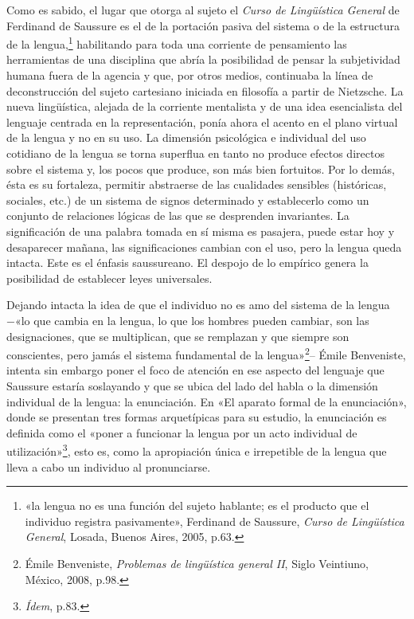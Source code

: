Como es sabido, el lugar que otorga al sujeto el \emph{Curso de Lingüística General} de Ferdinand de Saussure es el de la portación pasiva del sistema o de la estructura de la lengua,\footnote{«la lengua no es una función del sujeto hablante; es el producto que el individuo registra pasivamente», Ferdinand de Saussure, \emph{Curso de Lingüística General}, Losada, Buenos Aires, 2005, p.63.} habilitando para toda una corriente de pensamiento las herramientas de una disciplina que abría la posibilidad de pensar la subjetividad humana fuera de la agencia y que, por otros medios, continuaba la línea de deconstrucción del sujeto cartesiano iniciada en filosofía a partir de Nietzsche. La nueva lingüística, alejada de la corriente mentalista y de una idea esencialista del lenguaje centrada en la representación, ponía ahora el acento en el plano virtual de la lengua y no en su uso. La dimensión psicológica e individual del uso cotidiano de la lengua se torna superflua en tanto no produce efectos directos sobre el sistema y, los pocos que produce, son más bien fortuitos. Por lo demás, ésta es su fortaleza, permitir abstraerse de las cualidades sensibles (históricas, sociales, etc.) de un sistema de signos determinado y establecerlo como un conjunto de relaciones lógicas de las que se desprenden invariantes. La significación de una palabra tomada en sí misma es pasajera, puede estar hoy y desaparecer mañana, las significaciones cambian con el uso, pero la lengua queda intacta. Este es el énfasis saussureano. El despojo de lo empírico genera la posibilidad de establecer leyes universales.

Dejando intacta la idea de que el individuo no es amo del sistema de la lengua −«lo que cambia en la lengua, lo que los hombres pueden cambiar, son las designaciones, que se multiplican, que se remplazan y que siempre son conscientes, pero jamás el sistema fundamental de la lengua»\footnote{Émile Benveniste, \emph{Problemas de lingüística general II}, Siglo Veintiuno, México, 2008, p.98.}-- Émile Benveniste, intenta sin embargo poner el foco de atención en ese aspecto del lenguaje que Saussure estaría soslayando y que se ubica del lado del habla o la dimensión individual de la lengua: la enunciación. En «El aparato formal de la enunciación», donde se presentan tres formas arquetípicas para su estudio, la enunciación es definida como el «poner a funcionar la lengua por un acto individual de utilización»\footnote{\emph{Ídem}, p.83.}, esto es, como la apropiación única e irrepetible de la lengua que lleva a cabo un individuo al pronunciarse.

